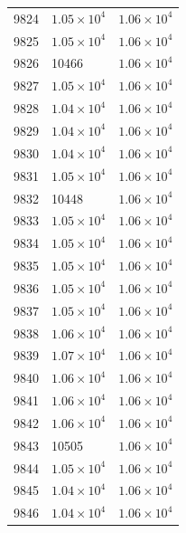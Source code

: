 \begin{table}[H]
\begin{tabular}{lll}
9824 & $\displaystyle 1.05 \times 10^{4}$ & $\displaystyle 1.06 \times 10^{4}$ \\
9825 & $\displaystyle 1.05 \times 10^{4}$ & $\displaystyle 1.06 \times 10^{4}$ \\
9826 & 10466 & $\displaystyle 1.06 \times 10^{4}$ \\
9827 & $\displaystyle 1.05 \times 10^{4}$ & $\displaystyle 1.06 \times 10^{4}$ \\
9828 & $\displaystyle 1.04 \times 10^{4}$ & $\displaystyle 1.06 \times 10^{4}$ \\
9829 & $\displaystyle 1.04 \times 10^{4}$ & $\displaystyle 1.06 \times 10^{4}$ \\
9830 & $\displaystyle 1.04 \times 10^{4}$ & $\displaystyle 1.06 \times 10^{4}$ \\
9831 & $\displaystyle 1.05 \times 10^{4}$ & $\displaystyle 1.06 \times 10^{4}$ \\
9832 & 10448 & $\displaystyle 1.06 \times 10^{4}$ \\
9833 & $\displaystyle 1.05 \times 10^{4}$ & $\displaystyle 1.06 \times 10^{4}$ \\
9834 & $\displaystyle 1.05 \times 10^{4}$ & $\displaystyle 1.06 \times 10^{4}$ \\
9835 & $\displaystyle 1.05 \times 10^{4}$ & $\displaystyle 1.06 \times 10^{4}$ \\
9836 & $\displaystyle 1.05 \times 10^{4}$ & $\displaystyle 1.06 \times 10^{4}$ \\
9837 & $\displaystyle 1.05 \times 10^{4}$ & $\displaystyle 1.06 \times 10^{4}$ \\
9838 & $\displaystyle 1.06 \times 10^{4}$ & $\displaystyle 1.06 \times 10^{4}$ \\
9839 & $\displaystyle 1.07 \times 10^{4}$ & $\displaystyle 1.06 \times 10^{4}$ \\
9840 & $\displaystyle 1.06 \times 10^{4}$ & $\displaystyle 1.06 \times 10^{4}$ \\
9841 & $\displaystyle 1.06 \times 10^{4}$ & $\displaystyle 1.06 \times 10^{4}$ \\
9842 & $\displaystyle 1.06 \times 10^{4}$ & $\displaystyle 1.06 \times 10^{4}$ \\
9843 & 10505 & $\displaystyle 1.06 \times 10^{4}$ \\
9844 & $\displaystyle 1.05 \times 10^{4}$ & $\displaystyle 1.06 \times 10^{4}$ \\
9845 & $\displaystyle 1.04 \times 10^{4}$ & $\displaystyle 1.06 \times 10^{4}$ \\
9846 & $\displaystyle 1.04 \times 10^{4}$ & $\displaystyle 1.06 \times 10^{4}$ \\

\end{tabular}
\end{table}
